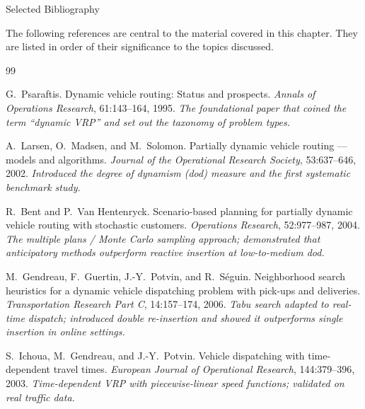 \documentclass[aspectratio=169,10pt]{beamer}
\begin{document}
\begin{frame}[allowframebreaks]{Selected Bibliography}

  The following references are central to the material covered in this chapter.
  They are listed in order of their significance to the topics discussed.

  \begin{thebibliography}{99}

    G.~Psaraftis.
    \newblock Dynamic vehicle routing: Status and prospects.
    \newblock \emph{Annals of Operations Research}, 61:143--164, 1995.
    \newblock \textit{The foundational paper that coined the term ``dynamic VRP''
                      and set out the taxonomy of problem types.}

    A.~Larsen, O.~Madsen, and M.~Solomon.
    \newblock Partially dynamic vehicle routing — models and algorithms.
    \newblock \emph{Journal of the Operational Research Society}, 53:637--646, 2002.
    \newblock \textit{Introduced the degree of dynamism (dod) measure and
                      the first systematic benchmark study.}

    R.~Bent and P.~Van Hentenryck.
    \newblock Scenario-based planning for partially dynamic vehicle routing
    with stochastic customers.
    \newblock \emph{Operations Research}, 52:977--987, 2004.
    \newblock \textit{The multiple plans / Monte Carlo sampling approach;
                      demonstrated that anticipatory methods outperform reactive
                      insertion at low-to-medium dod.}

    M.~Gendreau, F.~Guertin, J.-Y.~Potvin, and R.~S\'eguin.
    \newblock Neighborhood search heuristics for a dynamic vehicle
    dispatching problem with pick-ups and deliveries.
    \newblock \emph{Transportation Research Part C}, 14:157--174, 2006.
    \newblock \textit{Tabu search adapted to real-time dispatch; introduced
                      double re-insertion and showed it outperforms single
                      insertion in online settings.}

    S.~Ichoua, M.~Gendreau, and J.-Y.~Potvin.
    \newblock Vehicle dispatching with time-dependent travel times.
    \newblock \emph{European Journal of Operational Research}, 144:379--396, 2003.
    \newblock \textit{Time-dependent VRP with piecewise-linear speed functions;
                      validated on real traffic data.}


\end{thebibliography}
\end{frame}
\end{document}
